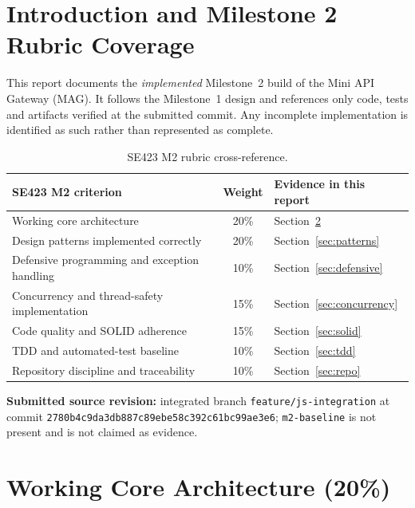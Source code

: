\documentclass[12pt,a4paper]{article}
\begin{document}
\section{Introduction and Milestone 2 Rubric Coverage}
This report documents the \emph{implemented} Milestone~2 build of the Mini API Gateway (MAG). It follows the Milestone~1 design and references only code, tests and artifacts verified at the submitted commit. Any incomplete implementation is identified as such rather than represented as complete.
\begin{table}[H]\centering\small
\begin{tabular}{L{6cm} c L{5.2cm}}\toprule
\textbf{SE423 M2 criterion} & \textbf{Weight} & \textbf{Evidence in this report}\\\midrule
Working core architecture & 20\% & Section~\ref{sec:core}\\
Design patterns implemented correctly & 20\% & Section~\ref{sec:patterns}\\
Defensive programming and exception handling & 10\% & Section~\ref{sec:defensive}\\
Concurrency and thread-safety implementation & 15\% & Section~\ref{sec:concurrency}\\
Code quality and SOLID adherence & 15\% & Section~\ref{sec:solid}\\
TDD and automated-test baseline & 10\% & Section~\ref{sec:tdd}\\
Repository discipline and traceability & 10\% & Section~\ref{sec:repo}\\\bottomrule
\end{tabular}\caption{SE423 M2 rubric cross-reference.}\end{table}
\textbf{Submitted source revision:} integrated branch \texttt{feature/js-integration} at commit \texttt{2780b4c9da3db887c89ebe58c392c61bc99ae3e6}; \texttt{m2-baseline} is not present and is not claimed as evidence.

\section{Working Core Architecture (20\%)}\label{sec:core}
\end{document}
